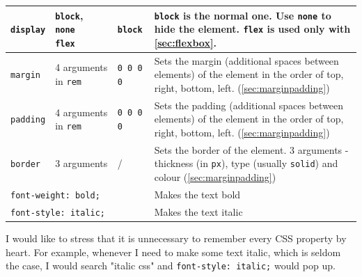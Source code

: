 \begin{table}[H]
\begin{tabular}{|m{6.5em}|m{5em}|m{5.5em}|m{16em}|}
        \texttt{display} &
        \makecell[lb]{
            \texttt{block}, \\
            \texttt{none} \\
            \texttt{flex}
        } & 
        \texttt{block} &
        \texttt{block} is the normal one. Use \texttt{none} to hide the element. \texttt{flex} is used only with \cref{sec:flexbox}.
        \\ \hline
        
        \texttt{margin} &
        4 arguments in \texttt{rem} & 
        \texttt{0 0 0 0} &
        Sets the margin (additional spaces between elements) of the element in the order of top, right, bottom, left. (\cref{sec:marginpadding})
        \\ \hline
        
        \texttt{padding} &
        4 arguments in \texttt{rem} & 
        \texttt{0 0 0 0} &
        Sets the padding (additional spaces between elements) of the element in the order of top, right, bottom, left.  (\cref{sec:marginpadding})
        \\ \hline
        
        \texttt{border} &
        3 arguments &
        / &
        Sets the border of the element. 3 arguments - thickness (in \texttt{px}), type (usually \texttt{solid}) and colour (\cref{sec:marginpadding})
        \\ \hline
        
        \multicolumn{3}{|l|}{\texttt{font-weight: bold;}} &
        Makes the text bold
        \\ \hline
        
        \multicolumn{3}{|l|}{\texttt{font-style: italic;}} &
        Makes the text italic
        \\ \hline
        
    \end{tabular}
\end{table}

I would like to stress that it is unnecessary to remember every CSS property by heart. For example, whenever I need to make some text italic, which is seldom the case, I would search "italic css" and \texttt{font-style: italic;} would pop up. 

